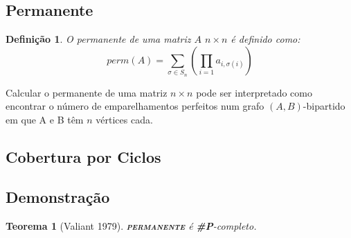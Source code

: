 \documentclass[paper=a4, fontsize=11pt]{scrartcl} %
\newtheorem{theorem}{Teorema}
\newtheorem{definition}{Definição}
\numberwithin{figure}{section} %
\newcommand{\perm}{perm}
\newcommand{\SP}{\textbf{\#P}\xspace}
\newcommand{\prob}[1]{\textsc{\textbf{#1}}}
\begin{document}
\subsection{Permanente}

\begin{definition} O permanente de uma matriz $A$ $n \times n$ é definido como: 
\[
\perm(A) = \sum\limits_{\sigma \in S_n} \left( \prod\limits_{i=1}a_{i,\sigma(i)} \right)
\]

\end{definition}

Calcular o permanente de uma matriz $n \times n$ pode ser interpretado como encontrar o número de emparelhamentos perfeitos num grafo $(A, B)$-bipartido em que A e B têm $n$ vértices cada.

\subsection{Cobertura por Ciclos}

\pagebreak
\subsection{Demonstração}

\begin{theorem}[Valiant 1979] \prob{permanente} é \SP-completo.
\end{theorem}
\end{document}
